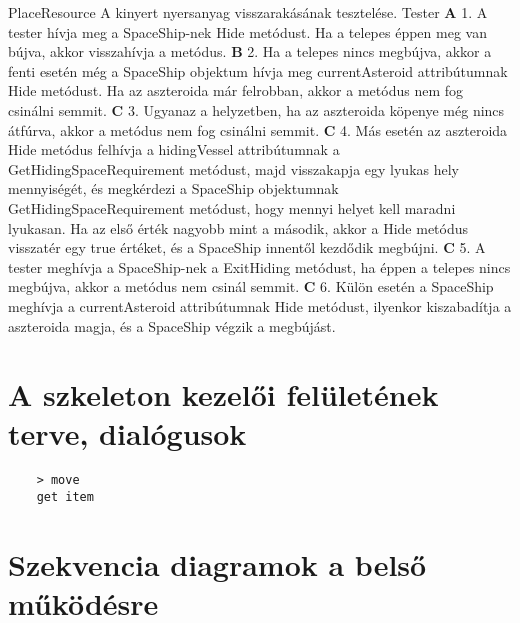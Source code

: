 \documentclass[../../projlab]{subfiles}
\begin{document}
\begin{use-case}
    {PlaceResource}
    {A kinyert nyersanyag visszarakásának tesztelése.}
    {Tester} 
    \textbf{A} 1.	A tester hívja meg a SpaceShip-nek Hide metódust. Ha a telepes éppen meg van bújva, akkor visszahívja a metódus. \newline
    \textbf{B} 2.	Ha a telepes nincs megbújva, akkor a fenti esetén még a SpaceShip objektum hívja meg currentAsteroid attribútumnak Hide metódust. Ha az aszteroida már felrobban, akkor a metódus nem fog csinálni semmit. \newline
    \textbf{C} 3.	Ugyanaz a helyzetben, ha az aszteroida köpenye még nincs átfúrva, akkor a metódus nem fog csinálni semmit. \newline
    \textbf{C} 4.	Más esetén az aszteroida Hide metódus felhívja a hidingVessel attribútumnak a GetHidingSpaceRequirement metódust, majd visszakapja egy lyukas hely mennyiségét, és megkérdezi a SpaceShip objektumnak GetHidingSpaceRequirement metódust, hogy mennyi helyet kell maradni lyukasan. Ha az első érték nagyobb mint a második, akkor a Hide metódus visszatér egy true értéket, és a SpaceShip innentől kezdődik megbújni. \newline
    \textbf{C} 5.	A tester meghívja a SpaceShip-nek a ExitHiding metódust, ha éppen a telepes nincs megbújva, akkor a metódus nem csinál semmit. \newline
    \textbf{C} 6.	Külön esetén a SpaceShip meghívja a currentAsteroid attribútumnak Hide metódust, ilyenkor kiszabadítja a aszteroida magja, és a SpaceShip végzik a megbújást. \newline
\end{use-case}

\section{A szkeleton kezelői felületének terve, dialógusok}

\begin{verbatim}
    > move
    get item
\end{verbatim}

\section{Szekvencia diagramok a belső működésre}
\end{document}
